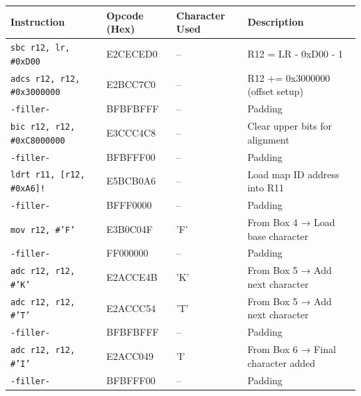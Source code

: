 \documentclass[a4paper]{usiinfbachelorproject}
\begin{document}
\begin{table}
	\begin{tabular}{|l|l|l|p{6cm}|}
		\hline
		\textbf{Instruction}                & \textbf{Opcode (Hex)} & \textbf{Character Used} & \textbf{Description}               \\
		\hline
		\texttt{sbc r12, lr, \#0xD00}       & E2CECED0              & --                      & R12 = LR - 0xD00 - 1               \\
		\texttt{adcs r12, r12, \#0x3000000} & E2BCC7C0              & --                      & R12 += 0x3000000 (offset setup)    \\
		\texttt{-filler-}                   & BFBFBFFF              & --                      & Padding                            \\
		\texttt{bic r12, r12, \#0xC8000000} & E3CCC4C8              & --                      & Clear upper bits for alignment     \\
		\texttt{-filler-}                   & BFBFFF00              & --                      & Padding                            \\
		\texttt{ldrt r11, [r12, \#0xA6]!}   & E5BCB0A6              & --                      & Load map ID address into R11       \\
		\texttt{-filler-}                   & BFFF0000              & --                      & Padding                            \\
		\texttt{mov r12, \#'F'}             & E3B0C04F              & 'F'                     & From Box 4 → Load base character   \\
		\texttt{-filler-}                   & FF000000              & --                      & Padding                            \\
		\texttt{adc r12, r12, \#'K'}        & E2ACCE4B              & 'K'                     & From Box 5 → Add next character    \\
		\texttt{adc r12, r12, \#'T'}        & E2ACCC54              & 'T'                     & From Box 5 → Add next character    \\
		\texttt{-filler-}                   & BFBFBFFF              & --                      & Padding                            \\
		\texttt{adc r12, r12, \#'I'}        & E2ACC049              & 'I'                     & From Box 6 → Final character added \\
		\texttt{-filler-}                   & BFBFFF00              & --                      & Padding                            \\

\end{tabular}
\end{table}
\end{document}
